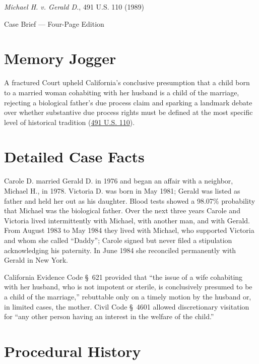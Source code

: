 \documentclass[12pt]{article}
\begin{document}
\begin{center}
{\LARGE \textit{Michael H. v. Gerald D.}, 491 U.S. 110 (1989)\par}
\vspace{0.8em}
{\large Case Brief --- Four-Page Edition\par}
\end{center}
\vspace{1em}

\section{Memory Jogger}

A fractured Court upheld California's conclusive presumption that a child born to a married woman cohabiting with her husband is a child of the marriage, rejecting a biological father's due process claim and sparking a landmark debate over whether substantive due process rights must be defined at the most specific level of historical tradition (\href{https://supreme.justia.com/cases/federal/us/491/110/}{491 U.S. 110}).

\section{Detailed Case Facts}

Carole D. married Gerald D. in 1976 and began an affair with a neighbor, Michael H., in 1978. Victoria D. was born in May 1981; Gerald was listed as father and held her out as his daughter. Blood tests showed a 98.07\% probability that Michael was the biological father. Over the next three years Carole and Victoria lived intermittently with Michael, with another man, and with Gerald. From August 1983 to May 1984 they lived with Michael, who supported Victoria and whom she called ``Daddy''; Carole signed but never filed a stipulation acknowledging his paternity. In June 1984 she reconciled permanently with Gerald in New York.

California Evidence Code \S~621 provided that ``the issue of a wife cohabiting with her husband, who is not impotent or sterile, is conclusively presumed to be a child of the marriage,'' rebuttable only on a timely motion by the husband or, in limited cases, the mother. Civil Code \S~4601 allowed discretionary visitation for ``any other person having an interest in the welfare of the child.''

\section{Procedural History}
\end{document}
